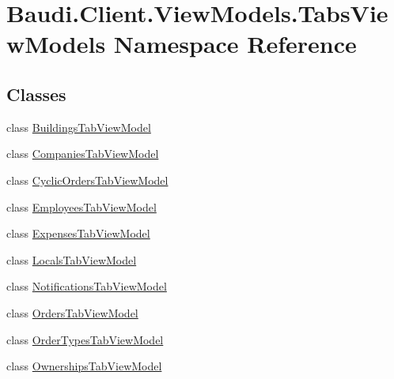 \hypertarget{namespace_baudi_1_1_client_1_1_view_models_1_1_tabs_view_models}{}\section{Baudi.\+Client.\+View\+Models.\+Tabs\+View\+Models Namespace Reference}
\label{namespace_baudi_1_1_client_1_1_view_models_1_1_tabs_view_models}
\subsection*{Classes}
\begin{DoxyCompactItemize}
\item 
class \hyperlink{class_baudi_1_1_client_1_1_view_models_1_1_tabs_view_models_1_1_buildings_tab_view_model}{Buildings\+Tab\+View\+Model}
\item 
class \hyperlink{class_baudi_1_1_client_1_1_view_models_1_1_tabs_view_models_1_1_companies_tab_view_model}{Companies\+Tab\+View\+Model}
\item 
class \hyperlink{class_baudi_1_1_client_1_1_view_models_1_1_tabs_view_models_1_1_cyclic_orders_tab_view_model}{Cyclic\+Orders\+Tab\+View\+Model}
\item 
class \hyperlink{class_baudi_1_1_client_1_1_view_models_1_1_tabs_view_models_1_1_employees_tab_view_model}{Employees\+Tab\+View\+Model}
\item 
class \hyperlink{class_baudi_1_1_client_1_1_view_models_1_1_tabs_view_models_1_1_expenses_tab_view_model}{Expenses\+Tab\+View\+Model}
\item 
class \hyperlink{class_baudi_1_1_client_1_1_view_models_1_1_tabs_view_models_1_1_locals_tab_view_model}{Locals\+Tab\+View\+Model}
\item 
class \hyperlink{class_baudi_1_1_client_1_1_view_models_1_1_tabs_view_models_1_1_notifications_tab_view_model}{Notifications\+Tab\+View\+Model}
\item 
class \hyperlink{class_baudi_1_1_client_1_1_view_models_1_1_tabs_view_models_1_1_orders_tab_view_model}{Orders\+Tab\+View\+Model}
\item 
class \hyperlink{class_baudi_1_1_client_1_1_view_models_1_1_tabs_view_models_1_1_order_types_tab_view_model}{Order\+Types\+Tab\+View\+Model}
\item 
class \hyperlink{class_baudi_1_1_client_1_1_view_models_1_1_tabs_view_models_1_1_ownerships_tab_view_model}{Ownerships\+Tab\+View\+Model}
\item 

\end{DoxyCompactItemize}
